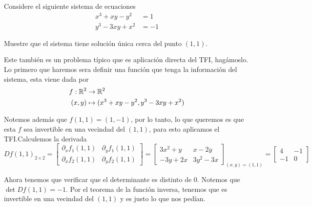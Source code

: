 \documentclass[a4paper,oneside,10.5pt]{article}
\begin{document}
\begin{prob}
    Considere el siguiente sistema de ecuaciones
    \begin{align*}
        x^3 + xy - y^2 &= 1\\
        y^3 - 3xy + x^2 &= -1
    \end{align*}

    Muestre que el sistema tiene solución única cerca del punto $(1, 1)$.
\end{prob}
\begin{sol}
    Este también es un problema típico que es aplicación directa del TFI, hagámoslo. Lo primero que haremos sera definir una función que tenga la información del sistema, esta viene dada por
    \begin{align*}
        f : \mathbb{R}^2 &\to \mathbb{R}^2\\
        (x, y) &\mapsto (x^3 + xy - y^2, y^3 - 3xy + x^2)
    \end{align*}

    Notemos además que $f(1, 1) = (1, -1)$, por lo tanto, lo que queremos es que esta $f$ sea invertible en una vecindad del $(1, 1)$, para esto aplicamos el TFI.\@ Calculemos la derivada
    \begin{equation*}
        {Df(1, 1)}_{2 \times 2} = \begin{bmatrix}
            \partial_x f_1(1, 1) & \partial_y f_1(1, 1)\\
            \partial_x f_2(1, 1) & \partial_y f_2(1, 1)
        \end{bmatrix} = \begin{bmatrix}
            3x^2 + y & x - 2y\\
            -3y + 2x & 3y^2 - 3x
        \end{bmatrix}_{(x, y) = (1, 1)} = \begin{bmatrix}
            4 & -1\\
            -1 & 0
        \end{bmatrix}
    \end{equation*}

    Ahora tenemos que verificar que el determinante es distinto de $0$. Notemos que $\det Df(1, 1) = -1$. Por el teorema de la función inversa, tenemos que es invertible en una vecindad del $(1, 1)$ y es justo lo que nos pedían.
\end{sol}
\end{document}
